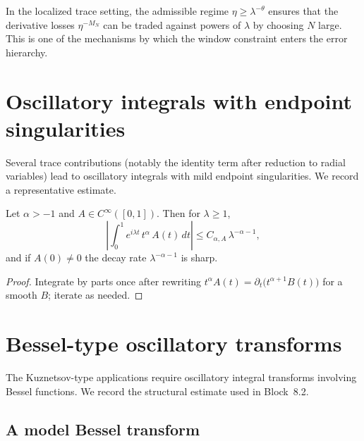 \begin{remark}
\label{rem:J.twoscale.interp}
In the localized trace setting, the admissible regime $\eta\ge \lambda^{-\theta}$ ensures that the derivative losses
$\eta^{-M_N}$ can be traded against powers of $\lambda$ by choosing $N$ large.  This is one of the mechanisms by which
the window constraint enters the error hierarchy.
\end{remark}

\section{Oscillatory integrals with endpoint singularities}
\label{sec:J.endpoints}

Several trace contributions (notably the identity term after reduction to radial variables) lead to oscillatory
integrals with mild endpoint singularities.  We record a representative estimate.

\begin{lemma}
\label{lem:J.endpoint}
Let $\alpha>-1$ and $A\in C^\infty([0,1])$.  Then for $\lambda\ge 1$,
\begin{equation}\label{eq:J.endpoint.bound}
\left|\int_0^1 e^{i\lambda t}\,t^\alpha\,A(t)\,dt\right|
\le
C_{\alpha,A}\,\lambda^{-\alpha-1},
\end{equation}
and if $A(0)\neq 0$ the decay rate $\lambda^{-\alpha-1}$ is sharp.
\end{lemma}

\begin{proof}
Integrate by parts once after rewriting $t^\alpha A(t)=\partial_t\big(t^{\alpha+1}B(t)\big)$ for a smooth $B$; iterate
as needed.
\end{proof}

\section{Bessel-type oscillatory transforms}
\label{sec:J.bessel}

The Kuznetsov-type applications require oscillatory integral transforms involving Bessel functions.
We record the structural estimate used in Block~8.2.

\subsection{A model Bessel transform}
\label{subsec:J.bessel.model}


